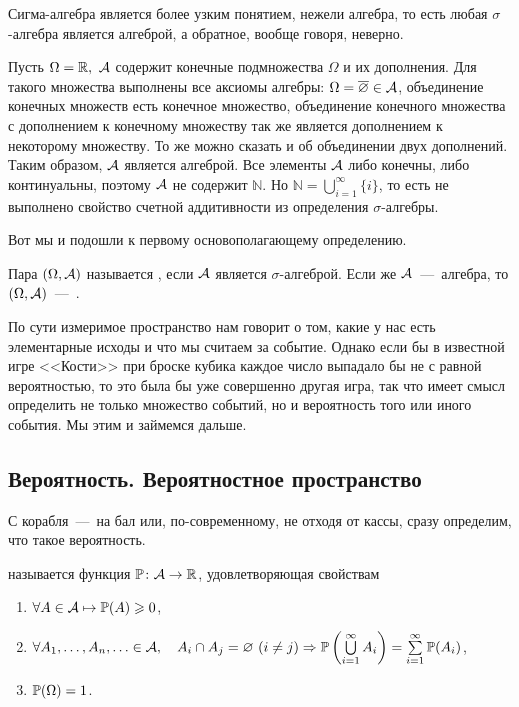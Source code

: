 \documentclass[../TV&MS.tex]{subfiles}
\begin{document}
Сигма-алгебра является более узким понятием, нежели алгебра, то есть любая 
$\sigma$-алгебра является алгеброй, а обратное, вообще говоря, неверно.

\begin{Ex}
	Пусть $\Omega = \mathbb{R},\  \mathcal{A}$ содержит конечные подмножества $\Omega$ и их дополнения. 
	Для такого множества выполнены все аксиомы алгебры: $\Omega = \overline{\varnothing} \in \mathcal{A}$,
	объединение конечных множеств есть конечное множество, объединение конечного множества с 
	дополнением к конечному множеству так же является дополнением к некоторому множеству. 
	То же можно сказать и об объединении двух дополнений. Таким образом, $\mathcal{A}$ является алгеброй.
	Все элементы $\mathcal{A}$ либо конечны, либо континуальны, поэтому $\mathcal{A}$ не содержит $\mathbb{N}$. 
	Но $\mathbb{N} = \bigcup\limits_{i=1}^{\infty}\{i\}$, то есть не выполнено свойство счетной 
	аддитивности из определения $\sigma$-алгебры.
\end{Ex}

	Вот мы и подошли к первому основополагающему определению.

\begin{Def}
	Пара $(\Omega, \mathcal{A})$ называется , если $\mathcal{A}$ является 
	$\sigma$-алгеброй. Если же $\mathcal{A}$~---~алгебра, то  $(\Omega, \mathcal{A})$~---~.
\end{Def}

По сути измеримое пространство нам говорит о том, какие у нас есть элементарные исходы 
и что мы считаем за событие. Однако если бы в известной игре <<Кости>> при броске
кубика каждое число выпадало бы не с равной вероятностью, то это была бы уже совершенно
другая игра, так что имеет смысл определить не только множество событий, но и
вероятность того или иного события. Мы этим и займемся дальше.


\subsection{Вероятность. Вероятностное пространство}
	
\qquad С корабля~---~на бал или, по-современному, не отходя от кассы, 
сразу определим, что такое вероятность.

\begin{Def}
	 называется функция $\mathbb{P} \colon \mathcal{A}\rightarrow \mathbb{R}$, 
	удовлетворяющая свойствам
\begin{enumerate}
	\item $\forall A \in \mathcal{A} \mapsto \mathbb{P} (A) \geqslant 0$,
    \item $\forall A_1, \dots, A_n, \ldots \in \mathcal{A}, \quad A_i \cap A_j  = \varnothing\  
    (i \not= j)  \Rightarrow \mathbb{P} \left(\bigcup\limits_{i=1}^{\infty} A_i\right) = 
    \sum\limits_{i = 1}^{\infty}\mathbb{P}(A_i)$,
	\item $\mathbb{P} (\Omega) = 1$.
\end{enumerate}
\end{Def}
\end{document}
